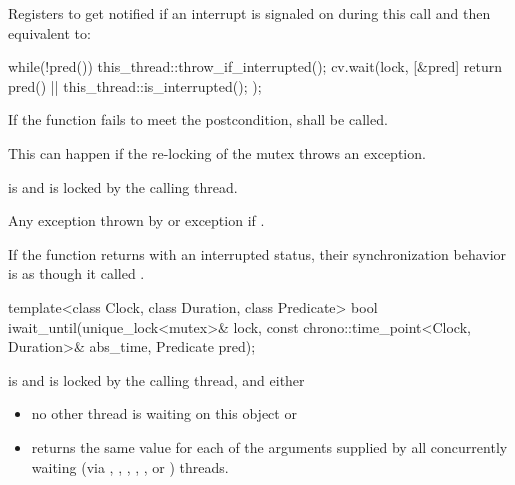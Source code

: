 {\begin{itemdescr}
{\color{diffcolor}
  \pnum\effects Registers  to get notified if an interrupt is signaled on 
                during this call and then equivalent to:
\begin{codeblock}
while(!pred()) {
  this_thread::throw_if_interrupted();
  cv.wait(lock, [&pred] {
                  return pred() || this_thread::is_interrupted();
                });
}
\end{codeblock}
}%
  
 \pnum \remarks
        If the function fails to meet the postcondition, 
        shall be called.
        \begin{note} This can happen if the re-locking of the mutex throws an exception. \end{note}

 \pnum \postconditions {} is  and 
        is locked by the calling thread.

 \pnum \throws Any exception thrown by 
                {\color{diffcolor}or exception  if
                 }.

{\color{diffcolor}
 \pnum\sync If the function returns with an interrupted status, 
                their synchronization behavior is as though it called .
}%
\end{itemdescr}



%
\begin{itemdecl}
template<class Clock, class Duration, class Predicate>
  bool iwait_until(unique_lock<mutex>& lock,
                   const chrono::time_point<Clock, Duration>& abs_time,
                   Predicate pred);
\end{itemdecl}
\begin{itemdescr}
 \pnum \requires {} is  and  is
                locked by the calling thread, and either

        \begin{itemize}
        \item no other thread is waiting on this  object or
        \item {} returns the same value for each of the 
                arguments supplied by all concurrently waiting (via ,
                , 
                {\color{insertcolor}, , , or }) threads.
        \end{itemize}


\end{itemdescr}}

